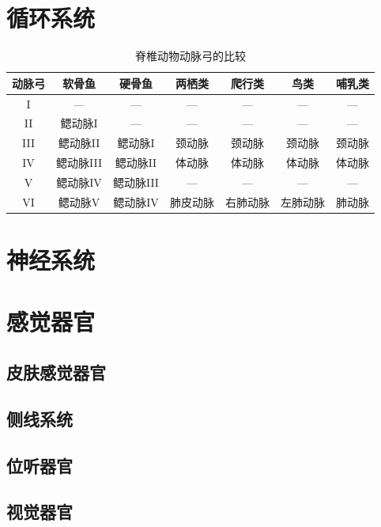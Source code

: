 \section{循环系统}

\begin{table}[htbp]
	\centering
	\begin{tabularx}{\textwidth}{|c|C|C|c|c|c|c|}
		\hline
		动脉弓 & 软骨鱼 & 硬骨鱼 & 两栖类 & 爬行类 & 鸟类 & 哺乳类 \\ \hline
		I & --- & --- & --- & --- & --- & --- \\ \hline
		II & 鳃动脉I & --- & --- & --- & --- & --- \\ \hline
		III & 鳃动脉II & 鳃动脉I & 颈动脉 & 颈动脉 & 颈动脉 & 颈动脉 \\ \hline
		IV & 鳃动脉III & 鳃动脉II & 体动脉 & 体动脉 & 体动脉 & 体动脉 \\ \hline
		V & 鳃动脉IV & 鳃动脉III & --- & --- & --- & --- \\ \hline
		VI & 鳃动脉V & 鳃动脉IV & 肺皮动脉 & 右肺动脉 & 左肺动脉 & 肺动脉 \\ \hline
	\end{tabularx}
	\caption{脊椎动物动脉弓的比较}
	\label{tab:Comparative_Aortic_Arches_Vertebrates}
\end{table}





\section{神经系统}


\section{感觉器官}

\subsection{皮肤感觉器官}

\subsection{侧线系统}

\subsection{位听器官}

\subsection{视觉器官}

